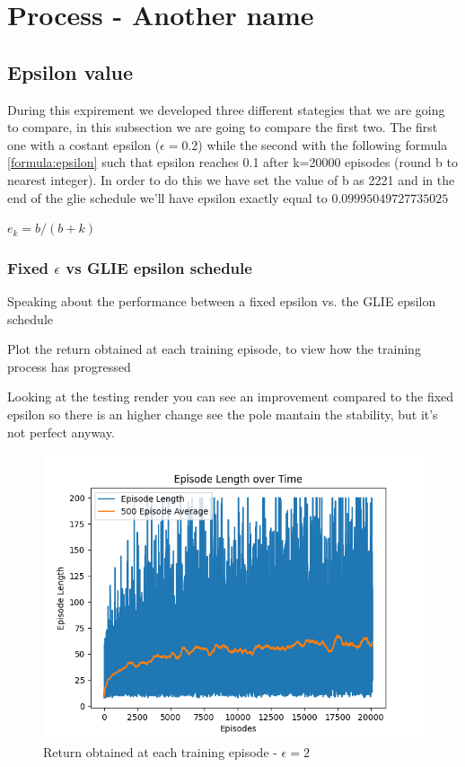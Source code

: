 \documentclass{article}
\begin{document}
\section{Process - Another name}
\subsection{Epsilon value}
During this expirement we developed three different stategies that we are going to compare, in this subsection we are going to compare the first two. The first one with a costant epsilon  ($\epsilon =  0.2$) while the second with the following formula \ref{formula:epsilon} such that epsilon reaches 0.1 after k=20000 episodes (round b to nearest integer). In order to do this we have set the value of b as 2221 and in the end of the glie schedule we'll have epsilon exactly equal to $0.09995049727735025$

\centering
\label{formula:epsilon}
$ e_k = b / (b+k) $ 

\flushleft

\subsubsection{Fixed $\epsilon$ vs GLIE epsilon schedule}
Speaking about the performance between a fixed epsilon vs. the GLIE epsilon schedule 

Plot the return obtained at each training episode, to view how the training process has
progressed

Looking at the testing render you can see an improvement compared to the fixed epsilon so there is an higher change see the pole mantain the stability, but it's not perfect anyway.

\begin{figure}[h]
	\centering
	\includegraphics[width=0.5\linewidth]{../data/plot/q_learning_constant_0.2.png}
	\caption{Return obtained at each training episode - $\epsilon = 2$}
	\label{fig:costant_eps}
\end{figure}
\end{document}
